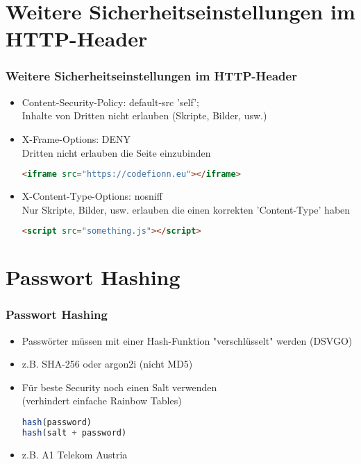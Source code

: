 \documentclass[ngerman2]{beamer}
\begin{document}
\section{Weitere Sicherheitseinstellungen im HTTP-Header}

\begin{frame}[fragile]
\frametitle{Weitere Sicherheitseinstellungen im HTTP-Header}
  \begin{itemize}
		\item Content-Security-Policy: default-src 'self';\\
			Inhalte von Dritten nicht erlauben (Skripte, Bilder, usw.)
		\item X-Frame-Options: DENY\\
			Dritten nicht erlauben die Seite einzubinden
      \begin{lstlisting}[language=HTML]
<iframe src="https://codefionn.eu"></iframe>
			\end{lstlisting}
		\item X-Content-Type-Options: nosniff\\
			Nur Skripte, Bilder, usw. erlauben die einen korrekten 'Content-Type' haben
      \begin{lstlisting}[language=HTML]
<script src="something.js"></script>
			\end{lstlisting}
  \end{itemize}
\end{frame}

\section{Passwort Hashing}

\begin{frame}[fragile]
\frametitle{Passwort Hashing}
  \begin{itemize}
		\item Passwörter müssen mit einer Hash-Funktion "verschlüsselt" werden (DSVGO)
		\item z.B. SHA-256 oder argon2i (nicht MD5)
		\item Für beste Security noch einen Salt verwenden\\
      (verhindert einfache Rainbow Tables)
      \begin{lstlisting}[language=JavaScript]
hash(password)
hash(salt + password)
			\end{lstlisting}
    \item z.B. A1 Telekom Austria
      \cite{a1passwoerter}
  \end{itemize}
\end{frame}
\end{document}
